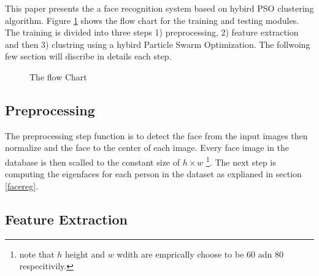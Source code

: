 \documentclass[a4paper,twoside]{article}
\begin{document}
This paper presents the a face recognition system based on hybird PSO clustering algorithm. Figure \ref{Blockchart} shows the flow chart for the training and testing modules. The training is divided into three steps 1) preprocessing, 2) feature extraction and then 3) clustring using a hybird Particle Swarm Optimization. The follwoing few section will discribe in details each step.


\begin{figure}
 \begin{center}
 \centering


\caption{ The flow Chart}
\label{Blockchart}
 \end{center}\end{figure}
\subsection{Preprocessing}
The preprocessing step function is to detect the face from the input images then normalize and the face to the center of each  image.  Every face image in the database is  then scalled to the constant size of $h \times w$ \footnote{ note that  $h$ height and $w$ wdith are emprically choose to be 60 adn 80 respecitivily.}. The next step is computing the eigenfaces for each person in the dataset as explianed in section \ref{facereg}.


\subsection{Feature Extraction}
\end{document}
